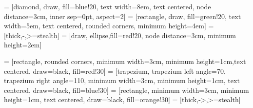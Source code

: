  = [diamond, draw, fill=blue!20,
    text width=8em, text centered, node distance=3cm, inner sep=0pt,   aspect=2]
 = [rectangle, draw, fill=green!20,
    text width=5em, text centered, rounded corners, minimum height=4em]
 = [thick,-,>=stealth]
 = [draw, ellipse,fill=red!20, node distance=3cm,
    minimum height=2em]

     = [rectangle, rounded corners, minimum width=3cm, minimum height=1cm,text centered, draw=black, fill=red!30]
     = [trapezium, trapezium left angle=70, trapezium right angle=110, minimum width=3cm, minimum height=1cm, text centered, draw=black, fill=blue!30]
     = [rectangle, minimum width=3cm, minimum height=1cm, text centered, draw=black, fill=orange!30]
 = [thick,->,>=stealth]

